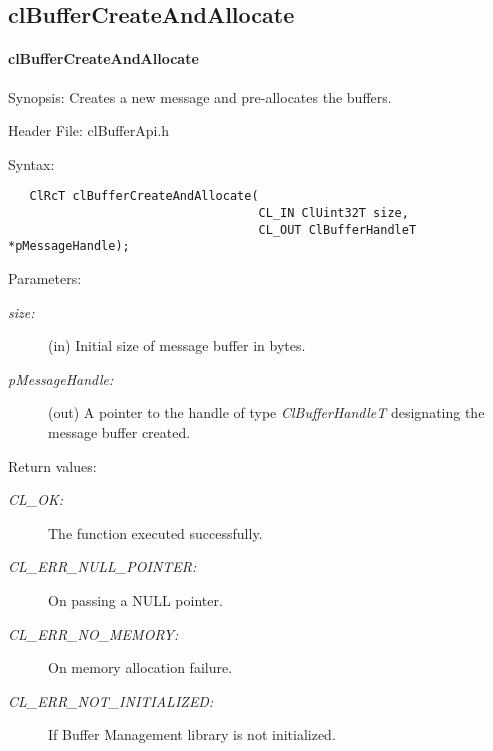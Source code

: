 \subsection{clBufferCreateAndAllocate}
\hypertarget{pagebuf104}{}\paragraph{cl\-Buffer\-Create\-And\-Allocate}\label{pagebuf104}
\begin{Desc}
\item[Synopsis:]Creates a new message and pre-allocates the buffers.\end{Desc}
\begin{Desc}
\item[Header File:]clBufferApi.h\end{Desc}
\begin{Desc}
\item[Syntax:]

\footnotesize\begin{verbatim}   ClRcT clBufferCreateAndAllocate(
                                   CL_IN ClUint32T size,
                                   CL_OUT ClBufferHandleT *pMessageHandle);
\end{verbatim}
\normalsize
\end{Desc}
\begin{Desc}
\item[Parameters:]
\begin{description}
\item[{\em size:}](in) Initial size of message buffer in bytes. 
\item[{\em p\-Message\-Handle:}](out) A pointer to the handle of type {\em Cl\-Buffer\-Handle\-T\/} designating the message buffer created.\end{description}
\end{Desc}
\begin{Desc}
\item[Return values:]
\begin{description}
\item[{\em CL\_\-OK:}]The function executed successfully. \item[{\em CL\_\-ERR\_\-NULL\_\-POINTER:}]On passing a NULL pointer. \item[{\em CL\_\-ERR\_\-NO\_\-MEMORY:}]On memory allocation failure. \item[{\em CL\_\-ERR\_\-NOT\_\-INITIALIZED:}]If Buffer Management library is not initialized.\end{description}
\end{Desc}
